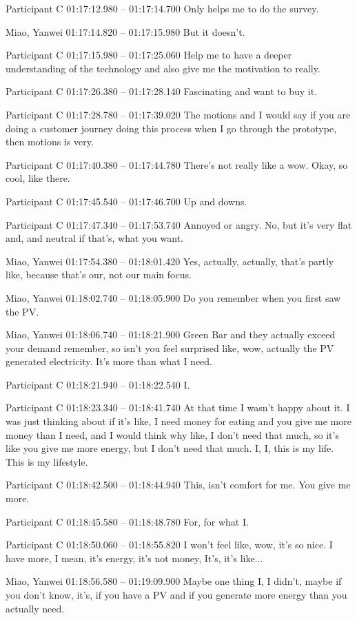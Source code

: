 {Participant C 01:17:12.980 -- 01:17:14.700
Only helps me to do the survey.

Miao, Yanwei 01:17:14.820 -- 01:17:15.980
But it doesn't.

Participant C 01:17:15.980 -- 01:17:25.060
Help me to have a deeper understanding of the technology and also give me the motivation to really.

Participant C 01:17:26.380 -- 01:17:28.140
Fascinating and want to buy it.

Participant C 01:17:28.780 -- 01:17:39.020
The motions and I would say if you are doing a customer journey doing this process when I go through the prototype, then motions is very.

Participant C 01:17:40.380 -- 01:17:44.780
There's not really like a wow. Okay, so cool, like there.

Participant C 01:17:45.540 -- 01:17:46.700
Up and downs.

Participant C 01:17:47.340 -- 01:17:53.740
Annoyed or angry. No, but it's very flat and, and neutral if that's, what you want.

Miao, Yanwei 01:17:54.380 -- 01:18:01.420
Yes, actually, actually, that's partly like, because that's our, not our main focus.

Miao, Yanwei 01:18:02.740 -- 01:18:05.900
Do you remember when you first saw the PV.

Miao, Yanwei 01:18:06.740 -- 01:18:21.900
Green Bar and they actually exceed your demand remember, so isn't you feel surprised like, wow, actually the PV generated electricity. It's more than what I need.

Participant C 01:18:21.940 -- 01:18:22.540
I.

Participant C 01:18:23.340 -- 01:18:41.740
At that time I wasn't happy about it. I was just thinking about if it's like, I need money for eating and you give me more money than I need, and I would think why like, I don't need that much, so it's like you give me more energy, but I don't need that much. I, I, this is my life. This is my lifestyle.

Participant C 01:18:42.500 -- 01:18:44.940
This, isn't comfort for me. You give me more.

Participant C 01:18:45.580 -- 01:18:48.780
For, for what I.

Participant C 01:18:50.060 -- 01:18:55.820
I won't feel like, wow, it's so nice. I have more, I mean, it's energy, it's not money, It's, it's like...

Miao, Yanwei 01:18:56.580 -- 01:19:09.900
Maybe one thing I, I didn't, maybe if you don't know, it's, if you have a PV and if you generate more energy than you actually need.

}
